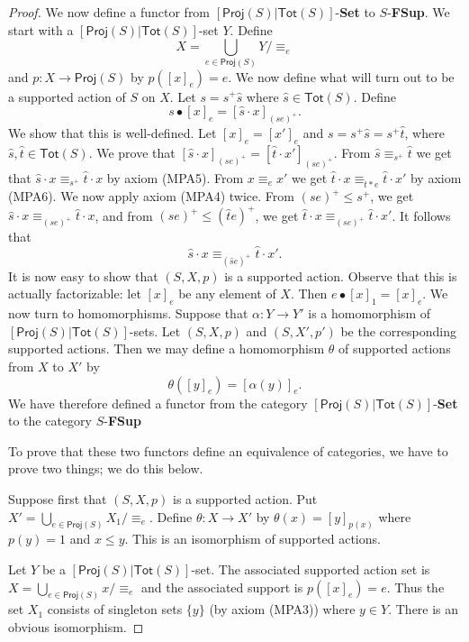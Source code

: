 \documentclass[a4paper]{amsart}
\begin{document}
\begin{proof}
We now define a functor from $[\mathsf{Proj}(S)|\mathsf{Tot}(S)]$-{\bf Set} to 
$S$-{\bf FSup}.
We start with a $[\mathsf{Proj}(S)|\mathsf{Tot}(S)]$-set $Y$.
Define
$$X = \bigcup_{e \in \mathsf{Proj}(S)} Y/\equiv_{e}$$
and
$p \colon X \rightarrow \mathsf{Proj}(S)$
by $p([x]_{e}) = e$.
We now define what will turn out to be a supported action of $S$ on $X$.
Let $s = s^{+}\hat{s}$ where $\hat{s} \in \mathsf{Tot}(S)$.
Define 
$$s \bullet [x]_{e} = [\hat{s} \cdot x]_{(se)^{+}}.$$
We show that this is well-defined.
Let $[x]_{e} = [x']_{e}$ and 
$s = s^{+}\hat{s} = s^{+}\hat{t}$, where $\hat{s}, \hat{t} \in \mathsf{Tot}(S)$.
We prove that
$[\hat{s} \cdot x]_{(se)^{+}} = [\hat{t} \cdot x']_{(se)^{+}}$.
From $\hat{s} \equiv_{s^{+}} \hat{t}$ we get that $\hat{s} \cdot x \equiv_{s^{+}} \hat{t} \cdot x$
by axiom (MPA5).
From $x \equiv_{e} x'$ we get $\hat{t} \cdot x \equiv_{\hat{t} \ast e} \hat{t} \cdot x'$
by axiom (MPA6).
We now apply axiom (MPA4) twice.
From $(se)^{+} \leq s^{+}$,
we get $\hat{s} \cdot x \equiv_{(se)^{+}} \hat{t} \cdot x$,
and from $(se)^{+} \leq (\hat{t}e)^{+}$,
we get $\hat{t} \cdot x \equiv_{(se)^{+}} \hat{t} \cdot x'$.
It follows that	
$$\hat{s} \cdot x \equiv_{(\hat{s}e)^{+}} \hat{t} \cdot x'.$$
It is now easy to show that $(S,X,p)$ is a supported action.
Observe that this is actually factorizable: 
let $[x]_{e}$ be any element of $X$.
Then $e \bullet [x]_{1} = [x]_{e}$.
We now turn to homomorphisms.
Suppose that $\alpha \colon Y \rightarrow Y'$ is a homomorphism of 
$[\mathsf{Proj}(S)|\mathsf{Tot}(S)]$-sets.
Let $(S,X,p)$ and $(S,X',p')$ be the corresponding supported actions.
Then we may define a homomorphism $\theta$ of supported actions from $X$ to $X'$
by
$$\theta ([y]_{e}) = [\alpha (y)]_{e}.$$
We have therefore defined a functor from the category 
$[\mathsf{Proj}(S)|\mathsf{Tot}(S)]$-{\bf Set} to 
the category $S$-{\bf FSup}

To prove that these two functors define an equivalence of categories,
we have to prove two things; we do this below.

Suppose first that $(S,X,p)$ is a supported action.
Put $X' = \bigcup_{e \in \mathsf{Proj}(S)} X_{1}/\equiv_{e}$.
Define $\theta \colon X \rightarrow X'$ by $\theta (x) = [y]_{p(x)}$
where $p(y) = 1$ and $x \leq y$.
This is an isomorphism of supported actions.

Let $Y$ be a $[\mathsf{Proj}(S)|\mathsf{Tot}(S)]$-set.
The associated supported action set is $X = \bigcup_{e \in \mathsf{Proj}(S)} x/\equiv_{e}$
and the associated support is $p([x]_{e}) = e$.
Thus the set $X_{1}$ consists of singleton sets $\{y\}$ (by axiom (MPA3)) where $y \in Y$.
There is an obvious isomorphism.  
\end{proof}
\end{document}
